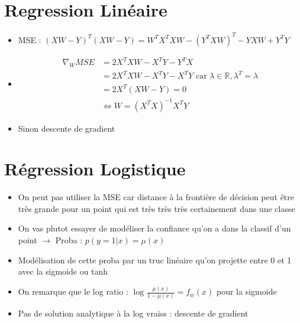 \documentclass{article}
\begin{document}
\section{Regression Linéaire}
\begin{itemize}
    \item MSE : $ (XW - Y)^T (XW - Y) = W^T X^T X W - (Y^T X W)^T - YXW + Y^TY $ 
    \item \begin{align*}
        \nabla _W MSE &= 2X^TXW - X^T Y - Y^T X  \\
            &= 2X^TXW - X^T Y - X^TY  \text{ car } \lambda \in \mathbb{R}, \lambda ^T = \lambda \\
            &= 2X^T (XW - Y) = 0 \\
            &\Leftrightarrow W = (X^TX)^{-1} X^T Y
    \end{align*}
    \item Sinon descente de gradient
\end{itemize}

\section{Régression Logistique}
\begin{itemize}
    \item On peut pas utiliser la MSE car distance à la frontière de décision peut être très grande pour un point qui est très très très certainement dans une classe
    \item On vas plutot essayer de modéliser la confiance qu'on a dans la classif d'un point $\rightarrow$ Proba : $ p(y=1|x) = \mu (x) $ 
    \item Modélisation de cette proba par un truc linéaire qu'on projette entre 0 et 1 avec la sigmoide ou tanh  
    \item On remarque que le log ratio : $ \log_{} \frac{\mu (x)}{1 - \mu (x)} = f_w(x) $ pour la sigmoide 
    \item Pas de solution analytique à la log vraiss : descente de gradient
\end{itemize}
\end{document}
